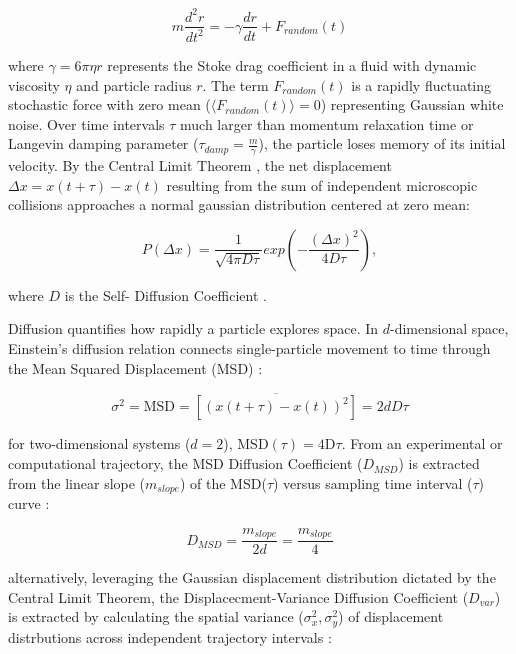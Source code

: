 \begin{equation}
    m\frac{d^2r}{dt^2}=-\gamma\frac{dr}{dt}+F_{random}(t)
\label{eqn:1.2}
\end{equation}

\noindent where $\gamma = 6 \pi \eta r$ represents the Stoke drag coefficient in a fluid with dynamic viscosity $\eta$ and particle radius $r$. The term $F_{random}(t)$ is a rapidly fluctuating stochastic force with zero mean ($\langle F_{random}(t) \rangle =0$) representing Gaussian white noise. Over time intervals $\tau$ much larger than momentum relaxation time or Langevin damping parameter ($\tau_{damp} = \frac{m}{\gamma}$), the particle loses memory of its initial velocity. By the Central Limit Theorem \cite{Feller1968}, the net displacement $\Delta x = x(t+\tau) -x(t)$ resulting from the sum of independent microscopic collisions approaches a normal gaussian distribution centered at zero mean:

\begin{equation}
    P(\Delta x) = \frac{1}{\sqrt{4\pi D\tau}}exp\left(-\frac{(\Delta x)^2}{4D\tau}\right),
\label{eqn:1.3}
\end{equation}

\noindent where $D$ is the Self- Diffusion Coefficient \cite{Einstein1956}.

\hspace{\parindent} Diffusion quantifies how rapidly a particle explores space. In $d$-dimensional space, Einstein's diffusion relation connects single-particle movement to time through the Mean Squared Displacement (MSD) \cite{Einstein1956, Cusi2020}:

\begin{equation}
    \sigma^2 = \mathrm{MSD} = \overline{[(x(t+\tau)-x(t))^2]} = 2dD\tau
\label{eqn:1.4}
\end{equation}

\noindent for two-dimensional systems ($d=2$), MSD$(\tau) = 4$D$\tau$. From an experimental or computational trajectory, the MSD Diffusion Coefficient ($D_{MSD}$) is extracted from the linear slope ($m_{slope}$) of the MSD($\tau$) versus sampling time interval ($\tau$) curve \cite{Cusi2020, balejado2025}:

\begin{equation}
    D_{MSD} = \frac{m_{slope}}{2d} = \frac{m_{slope}}{4}
\label{eqn:1.5}
\end{equation}

\noindent alternatively, leveraging the Gaussian displacement distribution dictated by the Central Limit Theorem, the Displacecment-Variance Diffusion Coefficient ($D_{var}$) is extracted by calculating the spatial variance ($\sigma_x^2, \sigma_y^2$) of displacement distrbutions across independent trajectory intervals \cite{Cusi2020, balejado2025}:

